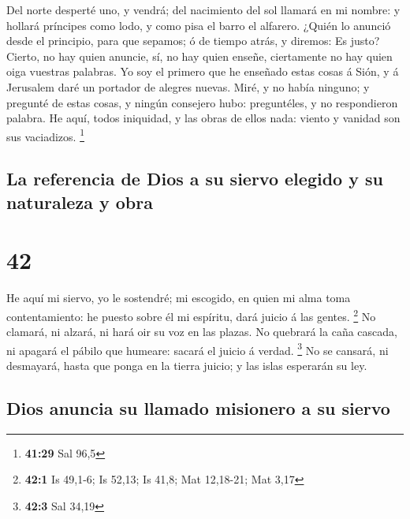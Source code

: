  Del norte desperté uno, y vendrá; del nacimiento del sol
llamará en mi nombre: y hollará príncipes como lodo, y como pisa el
barro el alfarero.  ¿Quién lo anunció desde el principio,
para que sepamos; ó de tiempo atrás, y diremos: Es justo? Cierto, no hay
quien anuncie, sí, no hay quien enseñe, ciertamente no hay quien oiga
vuestras palabras.  Yo soy el primero que he enseñado
estas cosas á Sión, y á Jerusalem daré un portador de alegres nuevas.
 Miré, y no había ninguno; y pregunté de estas cosas, y
ningún consejero hubo: preguntéles, y no respondieron palabra.
 He aquí, todos iniquidad, y las obras de ellos nada:
viento y vanidad son sus vaciadizos. \footnote{\textbf{41:29} Sal 96,5}

\hypertarget{la-referencia-de-dios-a-su-siervo-elegido-y-su-naturaleza-y-obra}{%
\subsection{La referencia de Dios a su siervo elegido y su naturaleza y
obra}\label{la-referencia-de-dios-a-su-siervo-elegido-y-su-naturaleza-y-obra}}

\hypertarget{section-41}{%
\section{42}\label{section-41}}

 He aquí mi siervo, yo le sostendré; mi escogido, en quien
mi alma toma contentamiento: he puesto sobre él mi espíritu, dará juicio
á las gentes. \footnote{\textbf{42:1} Is 49,1-6; Is 52,13; Is 41,8; Mat
  12,18-21; Mat 3,17}  No clamará, ni alzará, ni hará oir
su voz en las plazas.  No quebrará la caña cascada, ni
apagará el pábilo que humeare: sacará el juicio á verdad. \footnote{\textbf{42:3}
  Sal 34,19}  No se cansará, ni desmayará, hasta que ponga
en la tierra juicio; y las islas esperarán su ley.

\hypertarget{dios-anuncia-su-llamado-misionero-a-su-siervo}{%
\subsection{Dios anuncia su llamado misionero a su
siervo}\label{dios-anuncia-su-llamado-misionero-a-su-siervo}}

